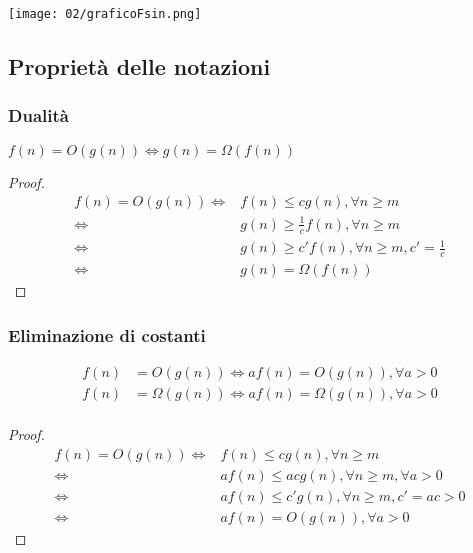                 \texttt{[image: 02/graficoFsin.png]}
    \subsection{Proprietà delle notazioni}
        \subsubsection{Dualità}
            $ f(n) = O(g(n)) \Leftrightarrow g(n) = \Omega(f(n)) $
            \begin{proof}
                $$
                    \begin{aligned}
                        f(n) = O(g(n)) \Leftrightarrow & f(n) \leq cg(n), \forall n\geq m \\
                        \Leftrightarrow & g(n) \geq \frac1cf(n), \forall n\geq m \\
                        \Leftrightarrow & g(n) \geq c'f(n), \forall n\geq m, c'=\frac1c \\
                        \Leftrightarrow & g(n) = \Omega(f(n))
                    \end{aligned}
                $$
            \end{proof}
        \subsubsection{Eliminazione di costanti}
            $$
                \begin{aligned}
                    f(n) &= O(g(n)) \Leftrightarrow af(n)=O(g(n)), \forall a>0 \\
                    f(n) &= \Omega(g(n)) \Leftrightarrow af(n)=\Omega(g(n)), \forall a>0 \\
                \end{aligned}
            $$
            \begin{proof}                
                $$
                    \begin{aligned}
                        f(n)=O(g(n)) \Leftrightarrow & f(n)\leq cg(n), \forall n\geq m \\
                        \Leftrightarrow & af(n)\leq acg(n), \forall n\geq m,\forall a>0 \\
                        \Leftrightarrow & af(n)\leq c'g(n), \forall n\geq m,c'=ac>0 \\
                        \Leftrightarrow & af(n)=O(g(n)), \forall a>0
                    \end{aligned}
                $$
            \end{proof}
